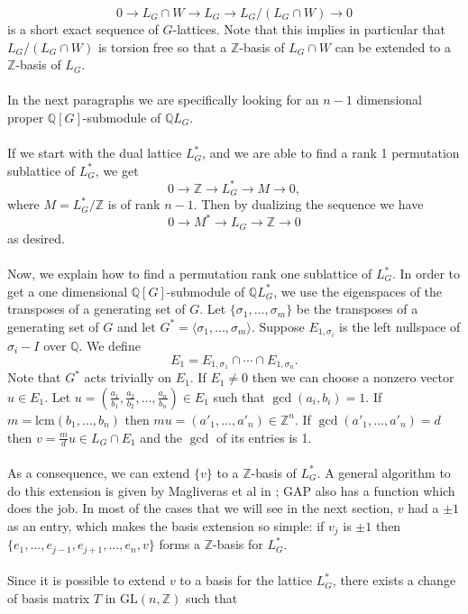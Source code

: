 \documentclass[a4paper, 14pt]{extarticle}
\theoremstyle{plain}
\theoremstyle{definition}
\newcommand{\Z}{\ensuremath{\mathbb{Z}}}
\newcommand{\Q}{\ensuremath{\mathbb{Q}}}
\begin{document}
$$0 \rightarrow L_G \cap W  \rightarrow L_G \rightarrow L_G/(L_G \cap W) \rightarrow 0$$
 is a short exact sequence of $G$-lattices. Note that this implies in particular that $L_G/(L_G \cap W)$ 
 is torsion free so that a $\Z$-basis of $L_G \cap W$ can be extended to a $\Z$-basis of $L_G$.\\
\\
In the next paragraphs we are specifically looking for an $n-1$ dimensional proper 
$\Q[G]$-submodule of $\Q L_G$.\\
\\
If we start with the dual lattice $L^*_G$, and we are able to find a rank 1 permutation 
sublattice of $L^*_G$, we get $$0 \rightarrow \Z  \rightarrow L^*_G \rightarrow M \rightarrow 0,$$ 
where $M = L^*_G/\Z$ is of rank $n-1$. Then by dualizing the sequence we have 
$$0 \rightarrow M^*  \rightarrow L_G \rightarrow \Z \rightarrow 0$$ as desired.
 \\
\\
Now, we explain how to find a permutation rank one sublattice of $L^*_G$. In order 
to get a one dimensional $\Q[G]$-submodule of $\Q L^*_G$, we use the eigenspaces of 
the transposes of a generating set of $G$. Let  $\lbrace \sigma_1, \ldots, \sigma_m\rbrace$ 
be the transposes of a generating set of $G$ and let  $G^* = \langle \sigma_1, \ldots, \sigma_m\rangle$. 
Suppose $E_{1,\sigma_i}$ is the left nullspace of $\sigma_i-I$ over $\Q$. 
We define $$E_1 = E_{1,\sigma_1}\cap \cdots \cap E_{1,\sigma_n}. $$
Note that $G^*$ acts trivially on $E_1$. If $E_1\neq {0}$ then we can choose a 
nonzero vector $u \in E_1$. Let $u = (\frac{a_1}{b_1}, \frac{a_2}{b_2}, \ldots , \frac{a_n}{b_n})\in E_1$ 
such that $\gcd(a_i, b_i) = 1$. If $m = \mathrm{lcm}(b_1, \ldots, b_n)$ then 
$m u = (a'_1, \ldots, a'_n) \in\Z^n$. If $\gcd (a'_1, \ldots, a'_n) = d$ then 
$v =\frac{m}{d} u \in L_G \cap E_1$ and the $\gcd$ of its entries is 1. \\
\\
As a consequence, we can extend $\lbrace v \rbrace$ to a $\Z$-basis of $L^*_G$. 
A general algorithm to do this extension is given by Magliveras et al in 
\cite{LatticeBase}; GAP also has a function which does the job. In most of the 
cases that we will see in the next section, $v$ had a $\pm 1$ as an entry, which makes 
the basis extension so simple: if $v_j$ is $\pm 1$ then 
$\lbrace e_1, \ldots , e_{j-1}, e_{j+1}, \ldots, e_n , v \rbrace$ forms a $\Z$-basis for $L^*_G$.\\
\\  
Since it is possible to extend $v$ to a basis for the lattice $L^*_G$, there exists a change of basis matrix $T$ in $\mathrm{GL}(n,\Z)$ such that
\end{document}
